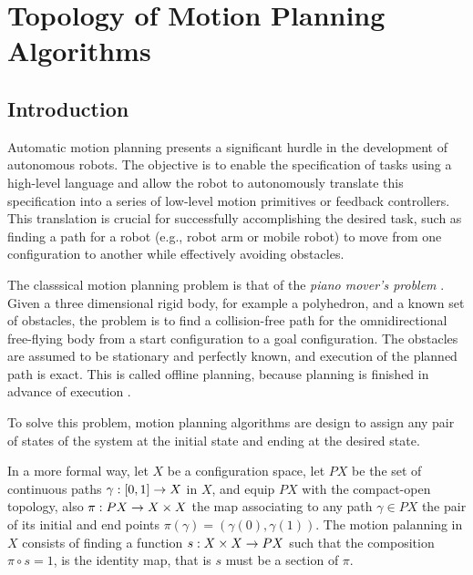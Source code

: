 \chapter{Topology of Motion Planning Algorithms}

\section{Introduction}

Automatic motion planning presents a significant hurdle in the development of autonomous robots.
The objective is to enable the specification of tasks using a high-level language and allow the robot to autonomously translate this specification into a series of low-level motion primitives or feedback controllers.
This translation is crucial for successfully accomplishing the desired task, such as finding a path for a robot (e.g., robot arm or mobile robot) to move from one configuration to another while effectively avoiding obstacles.

The classsical motion planning problem is that of the \textit{piano mover's problem} \cite{schwartz:1983a}.
Given a three dimensional rigid body, for example a polyhedron, and a known set of obstacles, the problem is to find a collision-free path for the omnidirectional free-flying body from a start configuration to a goal configuration.
The obstacles are assumed to be stationary and perfectly known, and execution of the planned path is exact.
This is called offline planning, because planning is finished in advance of execution \cite{choset2005principles}.


To solve this problem, motion planning algorithms are design to assign any pair of states of the system at the initial state and ending at the desired state.

In a more formal way, let $X$ be a configuration space, let $PX$ be the set of continuous paths $\displaystyle \gamma : [0,1] \rightarrow X$ in $X$, and equip $PX$ with the compact-open topology, also $\pi : PX \rightarrow X \times X$ the map associating to any path $\gamma \in PX$ the pair of its initial and end points $\pi(\gamma) = (\gamma(0), \gamma(1))$.
The motion palanning in $X$ consists of finding a function $s : X \times X \rightarrow PX$ such that the composition $\pi \circ s = 1$, is the identity map, that is $s$ must be a section of $\pi$.

